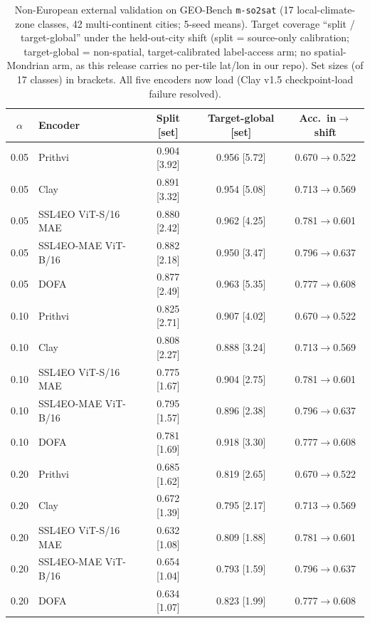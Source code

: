 \documentclass[journal]{IEEEtran}
\renewcommand{\_}{\textunderscore\allowbreak}
\begin{document}
\begin{table}[!t]\centering\small
\caption{Non-European external validation on GEO-Bench \texttt{m-so2sat} (17 local-climate-zone classes,
42 multi-continent cities; 5-seed means). Target coverage ``split / target-global'' under the held-out-city
shift (split = source-only calibration; target-global = non-spatial, target-calibrated label-access arm; no
spatial-Mondrian arm, as this release carries no per-tile lat/lon in our repo). Set sizes (of 17 classes) in
brackets. All five encoders now load (Clay v1.5 checkpoint-load failure resolved).}\label{tab:so2sat}
\begin{tabular}{clccc}
\toprule
$\alpha$ & Encoder & Split [set] & Target-global [set] & Acc.\ in$\to$shift \\
\midrule
0.05 & Prithvi & 0.904 [3.92] & 0.956 [5.72] & 0.670$\to$0.522 \\
0.05 & Clay & 0.891 [3.32] & 0.954 [5.08] & 0.713$\to$0.569 \\
0.05 & SSL4EO ViT-S/16 MAE & 0.880 [2.42] & 0.962 [4.25] & 0.781$\to$0.601 \\
0.05 & SSL4EO-MAE ViT-B/16 & 0.882 [2.18] & 0.950 [3.47] & 0.796$\to$0.637 \\
0.05 & DOFA & 0.877 [2.49] & 0.963 [5.35] & 0.777$\to$0.608 \\
\midrule
0.10 & Prithvi & 0.825 [2.71] & 0.907 [4.02] & 0.670$\to$0.522 \\
0.10 & Clay & 0.808 [2.27] & 0.888 [3.24] & 0.713$\to$0.569 \\
0.10 & SSL4EO ViT-S/16 MAE & 0.775 [1.67] & 0.904 [2.75] & 0.781$\to$0.601 \\
0.10 & SSL4EO-MAE ViT-B/16 & 0.795 [1.57] & 0.896 [2.38] & 0.796$\to$0.637 \\
0.10 & DOFA & 0.781 [1.69] & 0.918 [3.30] & 0.777$\to$0.608 \\
\midrule
0.20 & Prithvi & 0.685 [1.62] & 0.819 [2.65] & 0.670$\to$0.522 \\
0.20 & Clay & 0.672 [1.39] & 0.795 [2.17] & 0.713$\to$0.569 \\
0.20 & SSL4EO ViT-S/16 MAE & 0.632 [1.08] & 0.809 [1.88] & 0.781$\to$0.601 \\
0.20 & SSL4EO-MAE ViT-B/16 & 0.654 [1.04] & 0.793 [1.59] & 0.796$\to$0.637 \\
0.20 & DOFA & 0.634 [1.07] & 0.823 [1.99] & 0.777$\to$0.608 \\
\bottomrule
\end{tabular}
\end{table}
\end{document}
